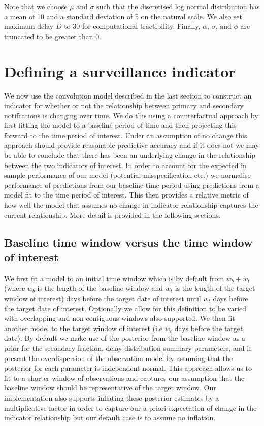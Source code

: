 \documentclass[
]{article}
\begin{document}
Note that we choose \(\mu\) and \(\sigma\) such that the discretised log
normal distribution has a mean of 10 and a standard deviation of 5 on
the natural scale. We also set maximum delay \(D\) to 30 for
computational tractibility. Finally, \(\alpha\), \(\sigma\), and
\(\phi\) are truncated to be greater than 0.

\hypertarget{defining-a-surveillance-indicator}{%
\section{Defining a surveillance
indicator}\label{defining-a-surveillance-indicator}}

We now use the convolution model described in the last section to
construct an indicator for whether or not the relationship between
primary and secondary notifcations is changing over time. We do this
using a counterfactual approach by first fitting the model to a baseline
period of time and then projecting this forward to the time period of
interest. Under an assumption of no change this approach should provide
reasonable predictive accuracy and if it does not we may be able to
conclude that there has been an underlying change in the relationship
between the two indicators of interest. In order to account for the
expected in sample performance of our model (potential misspecification
etc.) we normalise performance of predictions from our baseline time
period using predictions from a model fit to the time period of
interest. This then provides a relative metric of how well the model
that assumes no change in indicator relationship captures the current
relationship. More detail is provided in the following sections.

\hypertarget{baseline-time-window-versus-the-time-window-of-interest}{%
\subsection{Baseline time window versus the time window of
interest}\label{baseline-time-window-versus-the-time-window-of-interest}}

We first fit a model to an initial time window which is by default from
\(w_b + w_t\) (where \(w_b\) is the length of the baseline window and
\(w_t\) is the length of the target window of interest) days before the
target date of interest until \(w_t\) days before the target date of
interest. Optionally we allow for this definition to be varied with
overlapping and non-contiguous windows also supported. We then fit
another model to the target window of interest (i.e \(w_t\) days before
the target date). By default we make use of the posterior from the
baseline window as a prior for the secondary fraction, delay
distribution summary parameters, and if present the overdispersion of
the observation model by assuming that the posterior for each parameter
is independent normal. This approach allows us to fit to a shorter
window of observations and captures our assumption that the baseline
window should be representative of the target window. Our implementation
also supports inflating these posterior estimates by a multiplicative
factor in order to capture our a priori expectation of change in the
indicator relationship but our default case is to assume no inflation.
\end{document}
